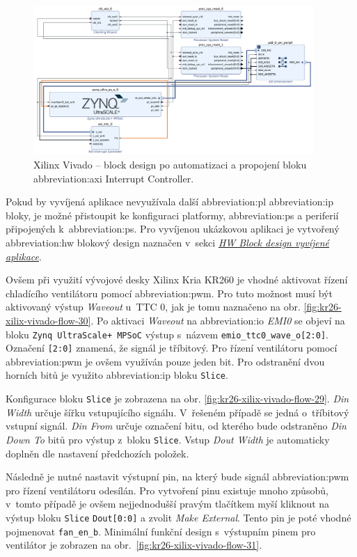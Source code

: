 \documentclass[a4paper, twoside, 11pt]{article}
\newcommand{\fbar}{\FloatBarrier}
\begin{document}
				\begin{figure}[htbp!]
					\centering
					\includegraphics[width=0.95\textwidth]{src/png/kr26-xilinx-vivado-flow/kr26-xilix-vivado-flow-12.jpg}
					\caption{Xilinx Vivado – block design po automatizaci a propojení bloku \gls{abbreviation:axi} Interrupt Controller.}
					\label{fig:kr26-xilix-vivado-flow-12}
				\end{figure}
				\fbar
				Pokud by vyvíjená aplikace nevyužívala další \gls{abbreviation:pl} \gls{abbreviation:ip} bloky, je možné přistoupit ke konfiguraci platformy, \gls{abbreviation:ps} a periferií připojených k~\gls{abbreviation:ps}. Pro vyvíjenou ukázkovou aplikaci je vytvořený \gls{abbreviation:hw} blokový design naznačen v~sekci \hyperref[subsubsec:hw-block-design-vyvijene-aplikace]{\textit{HW Block design vyvíjené aplikace}}.\par
				Ovšem při využití vývojové desky Xilinx Kria KR260 je vhodné aktivovat řízení chladícího ventilátoru pomocí \gls{abbreviation:pwm}. Pro tuto možnost musí být aktivovaný výstup \textit{Waveout} u~TTC 0, jak je tomu naznačeno na obr. \ref{fig:kr26-xilix-vivado-flow-30}. Po aktivaci \textit{Waveout} na \gls{abbreviation:io} \textit{EMI0} se objeví na bloku \texttt{Zynq UltraScale+ MPSoC} výstup s~názvem \texttt{emio\_ttc0\_wave\_o[2:0]}. Označení \texttt{[2:0]} znamená, že signál je tříbitový. Pro řízení ventilátoru pomocí \gls{abbreviation:pwm} je ovšem využíván pouze jeden bit. Pro odstranění dvou horních bitů je využito \gls{abbreviation:ip} bloku \texttt{Slice}.\par
				Konfigurace bloku \texttt{Slice} je zobrazena na obr. \ref{fig:kr26-xilix-vivado-flow-29}. \textit{Din Width} určuje šířku vstupujícího signálu. V~řešeném případě se jedná o~tříbitový vstupní signál. \textit{Din From} určuje označení bitu, od kterého bude odstraněno \textit{Din Down To} bitů pro výstup z~bloku \texttt{Slice}. Vstup \textit{Dout Width} je automaticky doplněn dle nastavení předchozích položek.\par
				Následně je nutné nastavit výstupní pin, na který bude signál \gls{abbreviation:pwm} pro řízení ventilátoru odesílán. Pro vytvoření pinu existuje mnoho způsobů, v~tomto případě je ovšem nejjednodušší pravým tlačítkem myší kliknout na výstup bloku \texttt{Slice} \texttt{Dout[0:0]} a zvolit \textit{Make External}. Tento pin je poté vhodné pojmenovat \texttt{fan\_en\_b}. Minimální funkční design s~výstupním pinem pro ventilátor je zobrazen na obr.~\ref{fig:kr26-xilix-vivado-flow-31}.
\end{document}
